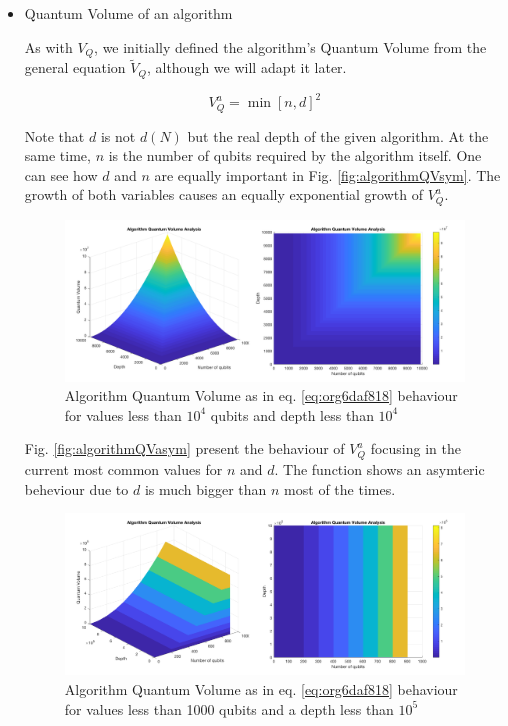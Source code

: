 \begin{itemize}
\begin{itemize}
\begin{itemize}
\item Quantum Volume of an algorithm
\label{sec:org46bb1d9}

As with \(V_Q\), we initially defined the algorithm's Quantum Volume from the general equation \(\tilde{V}_Q\), although we will adapt it later.

\begin{equation}
\label{eq:org6daf818}
V_Q^a = \min \left[ n,d \right]^2
\end{equation}

Note that \(d\) is not \(d(N)\) but the real depth of the given algorithm.
At the same time, \(n\) is the number of qubits required by the algorithm itself.
One can see how \(d\) and \(n\) are equally important in Fig. \ref{fig:algorithmQVsym}.
The growth of both variables causes an equally exponential growth of \(V^a_Q\).

\begin{figure}[htbp]
\centering
\includegraphics[width=\textwidth]{figures/V_q_analysis_sym.png}
\caption{\label{fig:org63d6830}
Algorithm Quantum Volume as in eq. \ref{eq:org6daf818} behaviour for values less than \(10^{4}\) qubits and depth less than \(10^{4}\)}
\end{figure}

Fig. \ref{fig:algorithmQVasym} present the behaviour of \(V_Q^a\)
focusing in the current most common values for \(n\) and \(d\).
The function shows an asymteric beheviour due to \(d\) is much bigger than \(n\) most of the times.


\begin{figure}[htbp]
\centering
\includegraphics[width=\textwidth]{figures/V_q_analysis_asym.png}
\caption{\label{fig:org5313bcd}
Algorithm Quantum Volume as in eq. \ref{eq:org6daf818} behaviour for values less than 1000 qubits and a depth less than \(10^{5}\)}
\end{figure}


\end{itemize}
\end{itemize}
\end{itemize}
